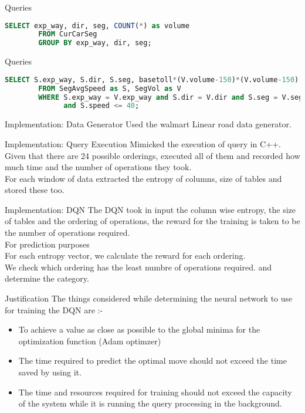 \begin{frame}[fragile]{Queries}
    \begin{lstlisting}[language=SQL, caption= SEGVOL linear road query]
        SELECT exp_way, dir, seg, COUNT(*) as volume
        FROM CurCarSeg
        GROUP BY exp_way, dir, seg;
    \end{lstlisting}
\end{frame}

\begin{frame}[fragile]{Queries}
    \begin{lstlisting}[language=SQL, caption= SEGTOLL linear road query]
        SELECT S.exp_way, S.dir, S.seg, basetoll*(V.volume-150)*(V.volume-150)
        FROM SegAvgSpeed as S, SegVol as V
        WHERE S.exp_way = V.exp_way and S.dir = V.dir and S.seg = V.seg
              and S.speed <= 40;
    \end{lstlisting}
\end{frame}

\begin{frame}{Implementation: Data Generator}
    Used the walmart Linear road data generator.
\end{frame}

\begin{frame}{Implementation: Query Execution}
    Mimicked the execution of query in C++.\\
    Given that there are 24 possible orderings, executed all of them and recorded how much time and the number of operations they took.\\
    For each window of data extracted the entropy of columns, size of tables and stored these too.
\end{frame}

\begin{frame}{Implementation: DQN}
    The DQN took in input the column wise entropy, the size of tables and the ordering of operations, the reward for the training is taken to be the number of operations required.\\
    For prediction purposes\\
    For each entropy vector, we calculate the reward for each ordering.\\
    We check which ordering has the least numbre of operations required. and determine the category.
\end{frame}

\begin{frame}{Justification}
The things considered while determining the neural network to use for training the DQN are :-
    \begin{itemize}[<+->]
        \item To achieve a value as close as possible to the global minima for the optimization function (Adam optimzer)
        \item The time required to predict the optimal move should not exceed the time saved by using it.
        \item The time and resources required for training should not exceed the capacity of the system while it is running the query processing in the background. 
    \end{itemize}
\end{frame}

